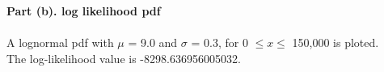 \documentclass[letterpaper,12pt]{article}
\theoremstyle{definition}
\begin{document}
\noindent\textbf{Part (b). log likelihood pdf} \\
\\
A lognormal pdf with $\mu$ = 9.0 and $\sigma$ = 0.3, for 0 $\leq x \leq$ 150,000 is ploted. \\
The log-likelihood value is -8298.636956005032. \\
\\
\begin{figure}[htb]\centering\captionsetup{width=6.0in}
  \caption{\textbf{}}
\end{figure} \\

\clearpage
\end{document}
